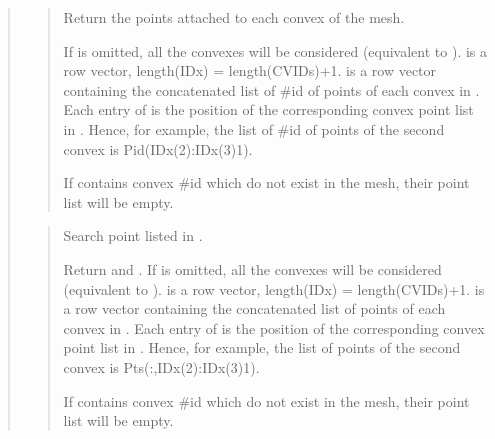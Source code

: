 \documentclass[a4paper,11pt,english]{sphinxmanual}
\begin{document}
\begin{quote}
\sphinxAtStartPar
{}
\begin{quote}

\sphinxAtStartPar
Return the points attached to each convex of the mesh.

\sphinxAtStartPar
If  is omitted, all the convexes will be considered
(equivalent to ).  is a
row vector, length(IDx) = length(CVIDs)+1.  is a
row vector containing the concatenated list of \#id of
points of each convex in . Each entry of  is the
position of the corresponding convex point list in . Hence,
for example, the list of \#id of points of the second convex is
Pid(IDx(2):IDx(3)\sphinxhyphen{}1).

\sphinxAtStartPar
If  contains convex \#id which do not exist in the mesh,
their point list will be empty.
\end{quote}

\sphinxAtStartPar
{}
\begin{quote}

\sphinxAtStartPar
Search point listed in .

\sphinxAtStartPar
Return  and .
If  is omitted, all the convexes will be considered
(equivalent to ).  is a
row vector, length(IDx) = length(CVIDs)+1.  is a
row vector containing the concatenated list of points
of each convex in . Each entry of  is the position
of the corresponding convex point list in . Hence, for
example, the list of points of the second convex is
Pts(:,IDx(2):IDx(3)\sphinxhyphen{}1).

\sphinxAtStartPar
If  contains convex \#id which do not exist in the mesh,
their point list will be empty.
\end{quote}

\sphinxAtStartPar
{}
\begin{quote}


\end{quote}
\end{quote}
\end{document}

